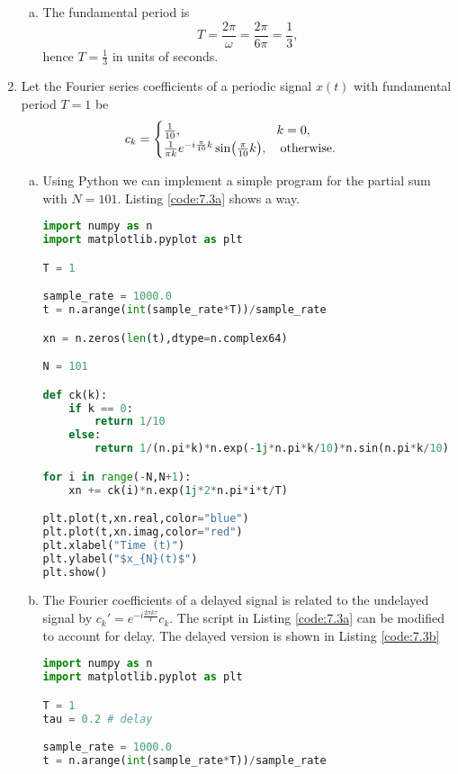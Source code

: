 \begin{enumerate}
\begin{enumerate}[a)]
\item The fundamental period is
$$T=\frac{2\pi}{\omega}=\frac{2\pi}{6\pi}=\frac{1}{3},$$
hence $T=\frac{1}{3}$ in units of seconds.
\end{enumerate}


\item Let the Fourier series coefficients of a periodic signal $x(t)$ with fundamental period $T=1$ be 
$$c_{k}=\begin{cases}
    \frac{1}{10}, \hspace{2.3cm}\quad k=0, \\
    \frac{1}{\pi k}e^{-i\frac{\pi}{10}k}\sin(\frac{\pi}{10}k),\quad \text{otherwise}.
\end{cases}$$

\begin{enumerate}[a)]
\item Using Python we can implement a simple program for the partial sum with $N=101$. Listing \ref{code:7.3a} shows a way. 
\begin{lstlisting}[language=Python, caption=Suggested solution to a),label=code:7.3a]
import numpy as n
import matplotlib.pyplot as plt

T = 1

sample_rate = 1000.0
t = n.arange(int(sample_rate*T))/sample_rate

xn = n.zeros(len(t),dtype=n.complex64)

N = 101

def ck(k):
    if k == 0:
        return 1/10
    else:
        return 1/(n.pi*k)*n.exp(-1j*n.pi*k/10)*n.sin(n.pi*k/10)

for i in range(-N,N+1):
    xn += ck(i)*n.exp(1j*2*n.pi*i*t/T)

plt.plot(t,xn.real,color="blue")
plt.plot(t,xn.imag,color="red")
plt.xlabel("Time (t)")
plt.ylabel("$x_{N}(t)$")
plt.show()
\end{lstlisting}

\item The Fourier coefficients of a delayed signal is related to the undelayed signal by $c_{k}'=e^{-i\frac{2\pi k\tau}{T}}c_{k}$. The script in Listing \ref{code:7.3a} can be modified to account for delay. The delayed version is shown in Listing \ref{code:7.3b}
\begin{lstlisting}[language=Python, caption=Suggested solution to b),label=code:7.3b]
import numpy as n
import matplotlib.pyplot as plt

T = 1
tau = 0.2 # delay

sample_rate = 1000.0
t = n.arange(int(sample_rate*T))/sample_rate


\end{lstlisting}
\end{enumerate}
\end{enumerate}
